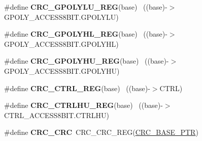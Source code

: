 \begin{DoxyCompactItemize}
\item 
\hypertarget{group___c_r_c___register___accessor___macros_ga1ad8ace74d9ab86940dfd4d066635b1c}{}\#define {\bfseries C\+R\+C\+\_\+\+G\+P\+O\+L\+Y\+L\+U\+\_\+\+R\+E\+G}(base)                                    ~((base)-\/$>$G\+P\+O\+L\+Y\+\_\+\+A\+C\+C\+E\+S\+S8\+B\+I\+T.\+G\+P\+O\+L\+Y\+L\+U)\label{group___c_r_c___register___accessor___macros_ga1ad8ace74d9ab86940dfd4d066635b1c}

\item 
\hypertarget{group___c_r_c___register___accessor___macros_gac5b8db04ab62b0ea728987e54a9aab93}{}\#define {\bfseries C\+R\+C\+\_\+\+G\+P\+O\+L\+Y\+H\+L\+\_\+\+R\+E\+G}(base)                                    ~((base)-\/$>$G\+P\+O\+L\+Y\+\_\+\+A\+C\+C\+E\+S\+S8\+B\+I\+T.\+G\+P\+O\+L\+Y\+H\+L)\label{group___c_r_c___register___accessor___macros_gac5b8db04ab62b0ea728987e54a9aab93}

\item 
\hypertarget{group___c_r_c___register___accessor___macros_ga1692656f77c7ec2de5c561f84e5811b2}{}\#define {\bfseries C\+R\+C\+\_\+\+G\+P\+O\+L\+Y\+H\+U\+\_\+\+R\+E\+G}(base)                                    ~((base)-\/$>$G\+P\+O\+L\+Y\+\_\+\+A\+C\+C\+E\+S\+S8\+B\+I\+T.\+G\+P\+O\+L\+Y\+H\+U)\label{group___c_r_c___register___accessor___macros_ga1692656f77c7ec2de5c561f84e5811b2}

\item 
\hypertarget{group___c_r_c___register___accessor___macros_gaf046fbac123e09bad1bf8238974247c5}{}\#define {\bfseries C\+R\+C\+\_\+\+C\+T\+R\+L\+\_\+\+R\+E\+G}(base)                                          ~((base)-\/$>$C\+T\+R\+L)\label{group___c_r_c___register___accessor___macros_gaf046fbac123e09bad1bf8238974247c5}

\item 
\hypertarget{group___c_r_c___register___accessor___macros_ga680ec9b0b037687ce6b43e13d72599a5}{}\#define {\bfseries C\+R\+C\+\_\+\+C\+T\+R\+L\+H\+U\+\_\+\+R\+E\+G}(base)                                      ~((base)-\/$>$C\+T\+R\+L\+\_\+\+A\+C\+C\+E\+S\+S8\+B\+I\+T.\+C\+T\+R\+L\+H\+U)\label{group___c_r_c___register___accessor___macros_ga680ec9b0b037687ce6b43e13d72599a5}

\item 
\hypertarget{group___c_r_c___register___accessor___macros_ga99e479e85b3b249fd5c296fa60993b19}{}\#define {\bfseries C\+R\+C\+\_\+\+C\+R\+C}~C\+R\+C\+\_\+\+C\+R\+C\+\_\+\+R\+E\+G(\hyperlink{group___c_r_c___peripheral_ga139bd4056b9e3c7987d28b6e955b662d}{C\+R\+C\+\_\+\+B\+A\+S\+E\+\_\+\+P\+T\+R})\label{group___c_r_c___register___accessor___macros_ga99e479e85b3b249fd5c296fa60993b19}


\end{DoxyCompactItemize}
